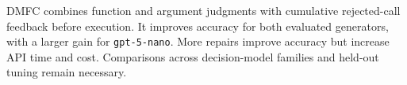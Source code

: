 DMFC combines function and argument judgments with cumulative rejected-call feedback before execution. It improves accuracy for both evaluated generators, with a larger gain for \texttt{gpt-5-nano}. More repairs improve accuracy but increase API time and cost. Comparisons across decision-model families and held-out tuning remain necessary.
